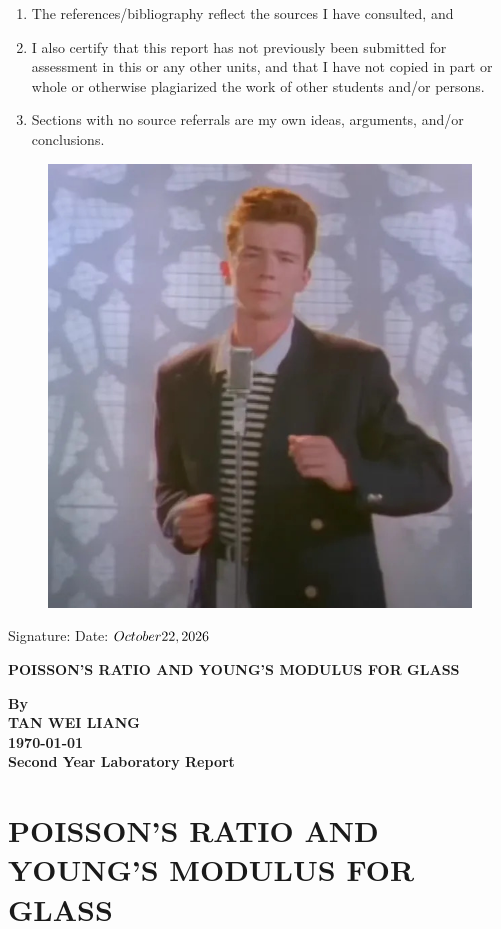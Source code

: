 \documentclass[a4paper,11pt]{article}
\begin{document}
\begin{enumerate}
    \item The references/bibliography reflect the sources I have consulted, and
    \item I also certify that this report has not previously been submitted for assessment in this or any other units, and that I have not copied in part or whole or otherwise plagiarized the work of other students and/or persons.
    \item Sections with no source referrals are my own ideas, arguments, and/or conclusions.
\end{enumerate}

\bigskip
\begin{figure}[H]
\hspace{35mm}
\includegraphics[width=0.1\linewidth]{signature.jpg}
\label{6}
\vspace{-12mm}
\end{figure}
\noindent Signature: \hrulefill \hfill Date: \uline{$\today$}

\newpage

\thispagestyle{empty}


\begin{center}
\vspace*{1cm}
\textbf{\Large POISSON'S RATIO AND YOUNG'S MODULUS FOR GLASS}

\vspace{3.0cm}
\textbf{\Large By}\\

\vspace{3.0cm}
\textbf{\Large TAN WEI LIANG} \\

\vspace{6.0cm}
\textbf{\Large \today}\\

\vfill
\textbf{\Large Second Year Laboratory Report}
\end{center}
\newpage

\section*{\Large \center POISSON'S RATIO AND YOUNG'S MODULUS FOR GLASS}
\end{document}
